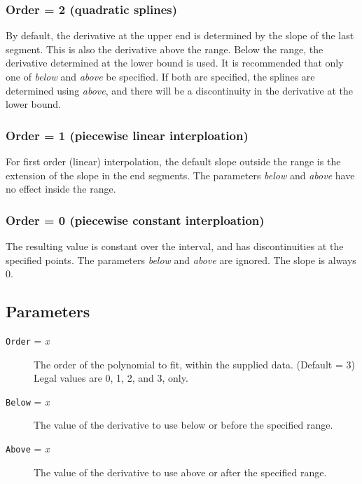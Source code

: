 \subsubsection{Order = 2 (quadratic splines)}

By default, the derivative at the upper end is determined by the slope
of the last segment.  This is also the derivative above the range.
Below the range, the derivative determined at the lower bound is used.
It is recommended that only one of {\em below} and {\em above} be
specified.  If both are specified, the splines are determined using
{\em above}, and there will be a discontinuity in the derivative at
the lower bound.

\subsubsection{Order = 1 (piecewise linear interploation)}

For first order (linear) interpolation, the default slope outside the
range is the extension of the slope in the end segments.  The
parameters {\em below} and {\em above} have no effect inside the
range.

\subsubsection{Order = 0 (piecewise constant interploation)}

The resulting value is constant over the interval, and has
discontinuities at the specified points.  The parameters {\em below}
and {\em above} are ignored.  The slope is always 0.
\subsection{Parameters}

\begin{description}
  
\item[{\tt Order} = {\it x}] The order of the polynomial to fit,
  within the supplied data.  (Default = 3) Legal values are 0, 1, 2,
  and 3, only.

\item[{\tt Below} = {\it x}] The value of the derivative to use
below or before the specified range.  

\item[{\tt Above} = {\it x}] The value of the derivative to use
above or after the specified range.

\end{description}

